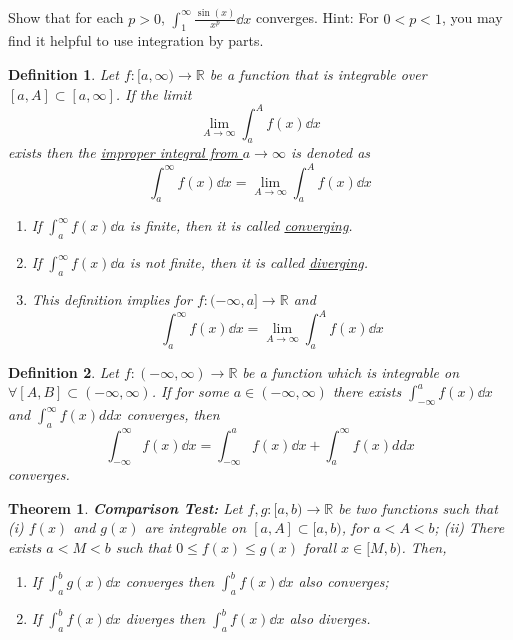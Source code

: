 \documentclass[]{article}
\newcommand{\R}{\mathbb{R}}
\newtheorem{definition}{Definition}
\newtheorem{theorem}{Theorem}
\begin{document}


\newpage
\section{}
Show that for each $p > 0$, $\int_{1}^{\infty} \frac{\sin(x)}{x^p} \dd{x}$ converges.
Hint: For $0<p<1$, you may find it helpful to use integration by parts.

\begin{definition}
    Let $f : [a,\infty) \to \R$ be a function that is integrable over $[a,A] \subset [a,\infty]$.
    If the limit\[
        \lim_{A\to \infty} \int_{a}^{A} f(x) \dd{x}
    \] exists then the \emph{\underline{improper integral from $a \to \infty$}} is denoted as \[
        \int_{a}^{\infty} f(x) \dd{x} = \lim_{A\to \infty} \int_{a}^{A} f(x) \dd{x}
    \]
    \begin{enumerate}
        \item If $\int_{a}^{\infty} f(x) \dd{a}$ is finite, then it is called \emph{\underline{converging}}.
        \item If $\int_{a}^{\infty} f(x) \dd{a}$ is not finite, then it is called \emph{\underline{diverging}}.
        \item This definition implies for $f : (-\infty, a] \to \R$ and \[
            \int_{a}^{\infty} f(x) \dd{x} = \lim_{A\to \infty} \int_{a}^{A} f(x) \dd{x}
        \]
    \end{enumerate}
\end{definition}

\begin{definition}
    Let $f:(-\infty,\infty) \to \R$ be a function which is integrable on $\forall [A,B] \subset (-\infty,\infty)$.
    If for some $a \in (-\infty, \infty)$ there exists $\int_{-\infty}^{a} f(x) \dd{x}$ and $\int_{a}^{\infty} f(x) dd{x}$ converges, then \[
        \int_{-\infty}^{\infty} f(x) \dd{x} 
        = \int_{-\infty}^{a} f(x) \dd{x}
        + \int_{a}^{\infty} f(x) dd{x}
    \] converges.
\end{definition}

\begin{theorem}\label{thm:comp_test}
    \textbf{Comparison Test:}
    Let $f,g:[a,b) \to \R$ be two functions such that 
    (i) $f(x)$ and $g(x)$ are integrable on $[a,A]\subset[a,b)$, for $a<A<b$;
    (ii) There exists $a < M < b$ such that $0\leq f(x) \leq g(x)$ forall $x \in [M,b)$.
    Then,\begin{enumerate}
        \item If $\int_a^b g(x) \dd{x}$ converges then $\int_a^b f(x) \dd{x}$ also converges;
        \item If $\int_a^b f(x) \dd{x}$ diverges then $\int_a^b f(x) \dd{x}$ also diverges.
    \end{enumerate}
\end{theorem}
\end{document}
